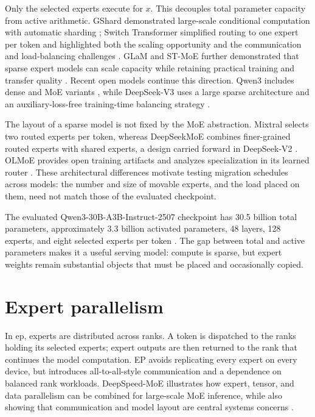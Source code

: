 Only the selected experts execute for $x$. This decouples total parameter
capacity from active arithmetic. GShard demonstrated large-scale conditional
computation with automatic sharding \cite{lepikhin2020gshard}; Switch
Transformer simplified routing to one expert per token and highlighted both
the scaling opportunity and the communication and load-balancing challenges
\cite{fedus2021switch}. GLaM and ST-MoE further demonstrated that sparse expert
models can scale capacity while retaining practical training and transfer
quality \cite{du2022glam,zoph2022stmoe}. Recent open models continue this direction. Qwen3
includes dense and MoE variants \cite{yang2025qwen3}, while DeepSeek-V3 uses a
large sparse architecture and an auxiliary-loss-free training-time balancing
strategy \cite{deepseek2024v3}.

The layout of a sparse model is not fixed by the MoE abstraction. Mixtral
selects two routed experts per token, whereas DeepSeekMoE combines finer-grained
routed experts with shared experts, a design carried forward in DeepSeek-V2
\cite{jiang2024mixtral,dai2024deepseekmoe,deepseek2024v2}. OLMoE provides open
training artifacts and analyzes specialization in its learned router
\cite{muennighoff2024olmoe}. These architectural differences motivate testing
migration schedules across models: the number and size of movable experts,
and the load placed on them, need not match those of the evaluated checkpoint.

The evaluated Qwen3-30B-A3B-Instruct-2507 checkpoint has 30.5 billion total
parameters, approximately 3.3 billion activated parameters, 48 layers, 128
experts, and eight selected experts per token \cite{qwen3modelcard}. The gap
between total and active parameters makes it a useful serving model: compute
is sparse, but expert weights remain substantial objects that must be placed
and occasionally copied.

\section{Expert parallelism}

In \gls{ep}, experts are distributed across ranks. A token is dispatched to
the ranks holding its selected experts; expert outputs are then returned to
the rank that continues the model computation. EP avoids replicating every
expert on every device, but introduces all-to-all-style communication and a
dependence on balanced rank workloads. DeepSpeed-MoE illustrates how expert,
tensor, and data parallelism can be combined for large-scale MoE inference,
while also showing that communication and model layout are central systems
concerns \cite{rajbhandari2022deepspeedmoe}.

